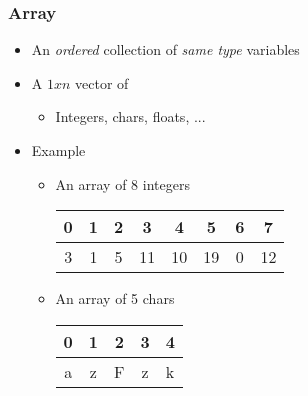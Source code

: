 \documentclass{../c-lecture}
\begin{document}
\begin{frame}
  \frametitle{Array}
  \begin{itemize}
    \item
      An \textit{\color{Orange} ordered} collection of
      \textit{\color{Orange} same type} variables

    \item A $1 x n$ vector of
    \begin{itemize}
      \item Integers, chars, floats, ...
    \end{itemize}
    \item Example
    \begin{itemize}
      \item An array of 8 integers
      \begin{table}
      \begin{tabular}{*{8}{c}}
        \toprule

        0 &
        1 &
        2 &
        3 &
        4 &
        5 &
        6 &
        7 \\

        \midrule

        3 &
        1 &
        5 &
        11 &
        10 &
        19 &
        0 &
        12 \\

        \bottomrule
      \end{tabular}
      \end{table}
      \item An array of 5 chars
      \begin{table}
      \begin{tabular}{*{4}{c}}
        \toprule

        0 &
        1 &
        2 &
        3 &
        4 \\

        \midrule

        a &
        z &
        F &
        z &
        k \\

        \bottomrule
      \end{tabular}
      \end{table}
    \end{itemize}
  \end{itemize}
\end{frame}
\end{document}
